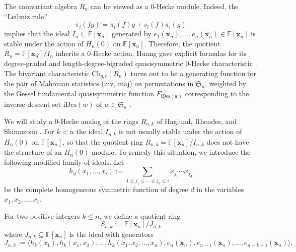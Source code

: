 \documentclass[ALCO,ThmDefs,published]{cedram}
\newcommand{\symm}{{\mathfrak{S}}}
\newcommand{\xx}{{\mathbf {x}}}
\newcommand{\FF}{{\mathbb{F}}}
\theoremstyle{plain}
\newcommand{\maj}{{\mathrm {maj}}}
\newcommand{\inv}{{\mathrm {inv}}}
\newcommand{\Ch}{{\mathrm {Ch}}}
\newcommand{\iDes}{{\mathrm {iDes}}}
\newcommand{\symm}{{\mathfrak{S}}}
\newcommand{\FF}{{\mathbb{F}}}
\newcommand{\xx}{{\mathbf {x}}}
\newcommand{\pib}{\overline{\pi}}
\begin{document}
The coinvariant algebra $R_n$ can be viewed as a 0-Hecke module.
Indeed, 
the ``Leibniz rule''
\begin{equation}
\label{leibniz}
\pib_i(fg) = \pib_i(f) g + s_i(f) \pib_i(g)
\end{equation}
implies that the ideal 
$I_n \subseteq \FF[\xx_n]$ generated by $e_1(\xx_n), \dots, e_n(\xx_n) \in \FF[\xx_n]$ 
is stable under the action of $H_n(0)$ on $\FF[\xx_n]$.  Therefore,
 the quotient $R_n = {\FF[\xx_n]} / {I_n}$ inherits a 0-Hecke action.
Huang gave explicit formulas for its degree-graded and length-degree-bigraded quasisymmetric 0-Hecke
characteristic \cite[Cor. 4.9]{Huang}.
The bivariant characteristic $\Ch_{q,t}(R_n)$ turns out to be a generating function for the 
pair of Mahonian statistics ($\inv$,  $\maj$) on permutations in $\symm_n$,
weighted by the Gessel fundamental quasisymmetric function $F_{\iDes(w)}$
corresponding to the inverse descent set  $\iDes(w)$ of $w\in\symm_n$ \cite[Cor. 4.9 (i)]{Huang}.



We will study a 0-Hecke analog of the rings $R_{n,k}$ of Haglund, Rhoades, and Shimozono \cite{HRS}.
For $k < n$ the ideal $I_{n,k}$ is not usually stable under the action of $H_n(0)$ on 
$\FF[\xx_n]$, so that the quotient ring $R_{n,k} = {\FF[\xx_n]} / {I_{n,k}}$ does not have the structure of 
an $H_n(0)$-module.  To remedy this situation, we introduce the following modified family of ideals.
Let 
\begin{equation}
h_d(x_1, \dots, x_i) := \sum_{1 \leq j_1 \leq \cdots \leq j_d \leq i} x_{j_1} \cdots x_{j_d} 
\end{equation}
be the complete homogeneous symmetric function of degree $d$ in the variables $x_1, x_2, \dots, x_i$.

\begin{defn}
For two positive integers $k \leq n$, we define a quotient ring 
\begin{equation*}
S_{n,k} := {\FF[\xx_n]} / {J_{n,k}}
\end{equation*}
where $J_{n,k} \subseteq \FF[\xx_n]$ is the ideal with generators
\begin{equation*}
J_{n,k} := \langle h_k(x_1), h_k(x_1, x_2), \dots, h_k(x_1, x_2, \dots, x_n), e_n(\xx_n), e_{n-1}(\xx_n), \dots, e_{n-k+1}(\xx_n) 
\rangle.
\end{equation*}
\end{defn}
\end{document}

